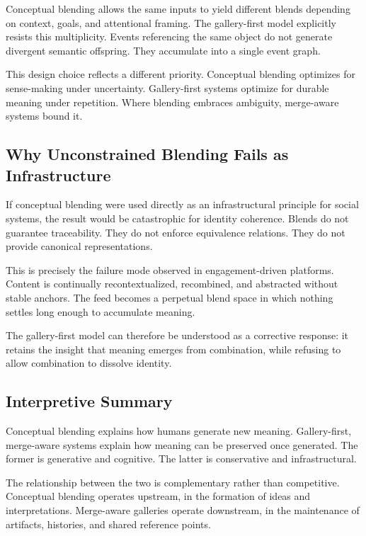 \documentclass[11pt,oneside]{article}
\begin{document}
Conceptual blending allows the same inputs to yield different blends depending on context, goals, and attentional framing. The gallery-first model explicitly resists this multiplicity. Events referencing the same object do not generate divergent semantic offspring. They accumulate into a single event graph.

This design choice reflects a different priority. Conceptual blending optimizes for sense-making under uncertainty. Gallery-first systems optimize for durable meaning under repetition. Where blending embraces ambiguity, merge-aware systems bound it.

\subsection{Why Unconstrained Blending Fails as Infrastructure}

If conceptual blending were used directly as an infrastructural principle for social systems, the result would be catastrophic for identity coherence. Blends do not guarantee traceability. They do not enforce equivalence relations. They do not provide canonical representations.

This is precisely the failure mode observed in engagement-driven platforms. Content is continually recontextualized, recombined, and abstracted without stable anchors. The feed becomes a perpetual blend space in which nothing settles long enough to accumulate meaning.

The gallery-first model can therefore be understood as a corrective response: it retains the insight that meaning emerges from combination, while refusing to allow combination to dissolve identity.

\subsection{Interpretive Summary}

Conceptual blending explains how humans generate new meaning. Gallery-first, merge-aware systems explain how meaning can be preserved once generated. The former is generative and cognitive. The latter is conservative and infrastructural.

The relationship between the two is complementary rather than competitive. Conceptual blending operates upstream, in the formation of ideas and interpretations. Merge-aware galleries operate downstream, in the maintenance of artifacts, histories, and shared reference points.
\end{document}
